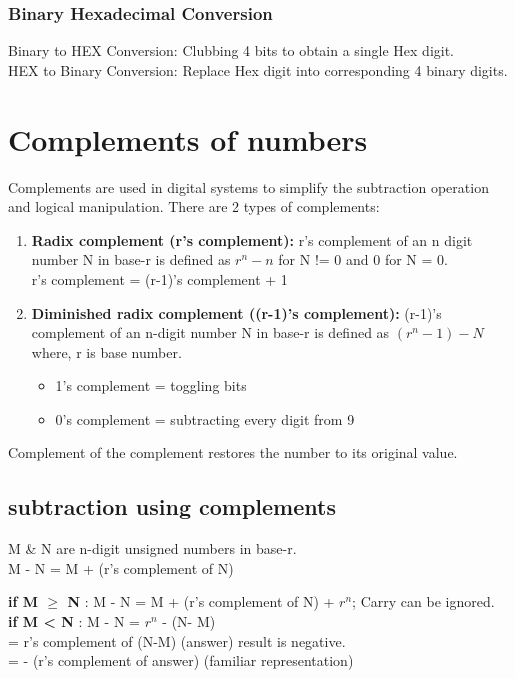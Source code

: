 \subsubsection{Binary Hexadecimal Conversion}
Binary to HEX Conversion:  Clubbing 4 bits to obtain a single Hex digit.\\
HEX to Binary Conversion:  Replace Hex digit into corresponding 4 binary digits.
\clearpage

\section{Complements of numbers}
Complements are used in digital systems to simplify the subtraction operation and logical manipulation. There are 2 types of complements:
\begin{enumerate}
    \item \textbf{Radix complement (r's complement):} r's complement of an n digit number N in base-r is defined as \(r^n-n\) for N != 0 and 0 for N = 0. \\  r's complement = (r-1)'s complement + 1
    \item \textbf{Diminished radix complement ((r-1)'s complement):} (r-1)'s complement of an n-digit number N in base-r is defined as \( (r^{n} -1 ) - N \) where, r is base number.
    \begin{itemize}
        \item 1's complement = toggling bits 
        \item 0's complement = subtracting every digit from 9
    \end{itemize}
\end{enumerate}
Complement of the complement restores the number to its original value.

\subsection{subtraction using complements}
M \& N are n-digit unsigned numbers in base-r.\\
M - N = M + (r's complement of N)

\textbf{if M \( \geqslant \) N} : M - N = M + (r's complement of N) + \(r^{n}\); Carry can be ignored.\\
\textbf{if M < N} : M - N = \(r^{n}\) - (N- M)\\ 
= r's complement of (N-M) (answer) result is negative.\\
= - (r's complement of answer) (familiar representation)

